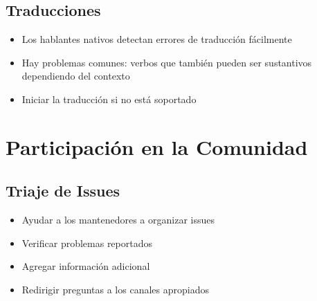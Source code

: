 \documentclass{presentacion}
\begin{document}
\subsection{Traducciones}
\begin{frame}
    \begin{itemize}[<+->]
        \item Los hablantes nativos detectan errores de traducción fácilmente
        \item Hay problemas comunes: verbos que también pueden ser sustantivos dependiendo del contexto
        \item Iniciar la traducción si no está soportado
    \end{itemize}
    
    \vspace{1em}
\end{frame}

\section{Participación en la Comunidad}

\subsection{Triaje de Issues}
\begin{frame}
    \begin{itemize}[<+->]
        \item Ayudar a los mantenedores a organizar issues
        \item Verificar problemas reportados
        \item Agregar información adicional
        \item Redirigir preguntas a los canales apropiados
    \end{itemize}
    
    \vspace{1em}
\end{frame}
\end{document}
